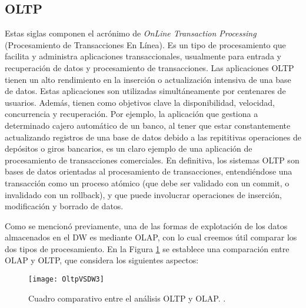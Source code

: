 \documentclass[a4paper,11pt]{article}
\begin{document}
    
    \subsection{OLTP}
    
    Estas siglas componen el acrónimo de \textit{OnLine Transaction Processing} (Procesamiento de Transacciones En Línea). Es un tipo
    de procesamiento que facilita y administra aplicaciones transaccionales, usualmente para entrada y recuperación de datos y procesamiento de
    transacciones.
    Las aplicaciones OLTP tienen un alto rendimiento en la inserción o actualización intensiva de una base de datos. Estas aplicaciones son utilizadas
    simultáneamente por centenares de usuarios. Además, tienen como objetivos clave la disponibilidad, velocidad, concurrencia y recuperación.
    Por ejemplo, la aplicación que gestiona a determinado cajero automático de un banco, al tener que estar constantemente actualizando registros de una
    base de datos debido a las repititivas operaciones de depósitos o giros bancarios, es un claro ejemplo de una aplicación de procesamiento de
    transacciones comerciales.
    En definitiva, los sistemas OLTP son bases de datos orientadas al procesamiento de transacciones, entendiéndose una transacción como un proceso
    atómico (que debe ser validado con un commit, o invalidado con un rollback), y que puede involucrar operaciones de inserción, modificación y
    borrado de datos.\par
    
    Como se mencionó previamente, una de las formas de explotación de los datos almacenados en el DW es mediante OLAP, con lo cual creemos útil
    comparar los dos tipos de procesamiento. En la Figura \ref{oltp_vs_olap} se establece una comparación entre OLAP y OLTP,
    que considera los siguientes aspectos:
    
    \begin{figure}
      \begin{center}
        \texttt{[image: OltpVSDW3]}
        \caption{Cuadro comparativo entre el análisis OLTP y OLAP. \cite[p.~42]{hefestov2}.}
        \label{oltp_vs_olap}
      \end{center}
    \end{figure}
    
\end{document}
